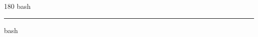 
\begin{frame}
\begin{center}
\begin{turn}{180}
{\fontsize{2.5cm}{1em}\selectfont bash}
\end{turn}
\vspace{1em}\par  
\hrule
\vspace{1em}\par  
{\fontsize{2.5cm}{1em}\selectfont bash}
\end{center}
\end{frame}

